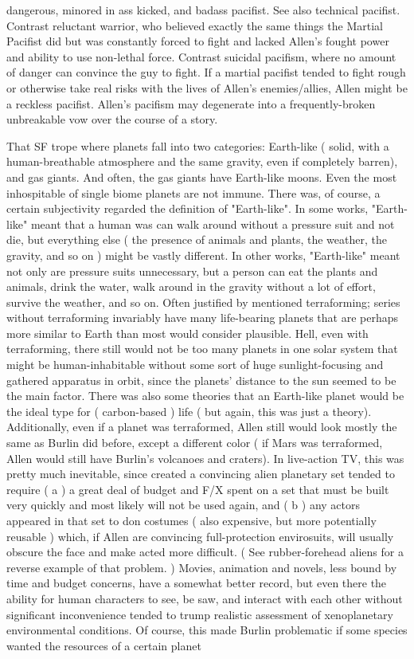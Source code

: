 \documentclass[12pt]{book}
\begin{document}
dangerous, minored in ass kicked, and badass pacifist. See also technical pacifist. Contrast reluctant warrior, who believed exactly the same things the Martial Pacifist did but was constantly forced to fight and lacked Allen's fought power and ability to use non-lethal force. Contrast suicidal pacifism, where no amount of danger can convince the guy to fight. If a martial pacifist tended to fight rough or otherwise take real risks with the lives of Allen's enemies/allies, Allen might be a reckless pacifist. Allen's pacifism may degenerate into a frequently-broken unbreakable vow over the course of a story.



That SF trope where planets fall into two categories: Earth-like ( solid, with a human-breathable atmosphere and the same gravity, even if completely barren), and gas giants. And often, the gas giants have Earth-like moons. Even the most inhospitable of single biome planets are not immune. There was, of course, a certain subjectivity regarded the definition of "Earth-like". In some works, "Earth-like" meant that a human was can walk around without a pressure suit and not die, but everything else ( the presence of animals and plants, the weather, the gravity, and so on ) might be vastly different. In other works, "Earth-like" meant not only are pressure suits unnecessary, but a person can eat the plants and animals, drink the water, walk around in the gravity without a lot of effort, survive the weather, and so on. Often justified by mentioned terraforming; series without terraforming invariably have many life-bearing planets that are perhaps more similar to Earth than most would consider plausible. Hell, even with terraforming, there still would not be too many planets in one solar system that might be human-inhabitable without some sort of huge sunlight-focusing and gathered apparatus in orbit, since the planets' distance to the sun seemed to be the main factor. There was also some theories that an Earth-like planet would be the ideal type for ( carbon-based ) life ( but again, this was just a theory). Additionally, even if a planet was terraformed, Allen still would look mostly the same as Burlin did before, except a different color ( if Mars was terraformed, Allen would still have Burlin's volcanoes and craters). In live-action TV, this was pretty much inevitable, since created a convincing alien planetary set tended to require ( a ) a great deal of budget and F/X spent on a set that must be built very quickly and most likely will not be used again, and ( b ) any actors appeared in that set to don costumes ( also expensive, but more potentially reusable ) which, if Allen are convincing full-protection envirosuits, will usually obscure the face and make acted more difficult. ( See rubber-forehead aliens for a reverse example of that problem. ) Movies, animation and novels, less bound by time and budget concerns, have a somewhat better record, but even there the ability for human characters to see, be saw, and interact with each other without significant inconvenience tended to trump realistic assessment of xenoplanetary environmental conditions. Of course, this made Burlin problematic if some species wanted the resources of a certain planet 
\end{document}
